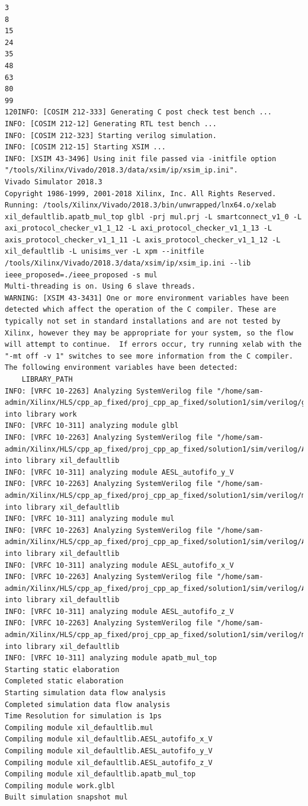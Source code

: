 \documentclass{article}
\begin{document}
\begin{lstlisting}
3
8
15
24
35
48
63
80
99
120INFO: [COSIM 212-333] Generating C post check test bench ...
INFO: [COSIM 212-12] Generating RTL test bench ...
INFO: [COSIM 212-323] Starting verilog simulation. 
INFO: [COSIM 212-15] Starting XSIM ...
INFO: [XSIM 43-3496] Using init file passed via -initfile option "/tools/Xilinx/Vivado/2018.3/data/xsim/ip/xsim_ip.ini".
Vivado Simulator 2018.3
Copyright 1986-1999, 2001-2018 Xilinx, Inc. All Rights Reserved.
Running: /tools/Xilinx/Vivado/2018.3/bin/unwrapped/lnx64.o/xelab xil_defaultlib.apatb_mul_top glbl -prj mul.prj -L smartconnect_v1_0 -L axi_protocol_checker_v1_1_12 -L axi_protocol_checker_v1_1_13 -L axis_protocol_checker_v1_1_11 -L axis_protocol_checker_v1_1_12 -L xil_defaultlib -L unisims_ver -L xpm --initfile /tools/Xilinx/Vivado/2018.3/data/xsim/ip/xsim_ip.ini --lib ieee_proposed=./ieee_proposed -s mul 
Multi-threading is on. Using 6 slave threads.
WARNING: [XSIM 43-3431] One or more environment variables have been detected which affect the operation of the C compiler. These are typically not set in standard installations and are not tested by Xilinx, however they may be appropriate for your system, so the flow will attempt to continue.  If errors occur, try running xelab with the "-mt off -v 1" switches to see more information from the C compiler. The following environment variables have been detected:
    LIBRARY_PATH
INFO: [VRFC 10-2263] Analyzing SystemVerilog file "/home/sam-admin/Xilinx/HLS/cpp_ap_fixed/proj_cpp_ap_fixed/solution1/sim/verilog/glbl.v" into library work
INFO: [VRFC 10-311] analyzing module glbl
INFO: [VRFC 10-2263] Analyzing SystemVerilog file "/home/sam-admin/Xilinx/HLS/cpp_ap_fixed/proj_cpp_ap_fixed/solution1/sim/verilog/AESL_autofifo_y_V.v" into library xil_defaultlib
INFO: [VRFC 10-311] analyzing module AESL_autofifo_y_V
INFO: [VRFC 10-2263] Analyzing SystemVerilog file "/home/sam-admin/Xilinx/HLS/cpp_ap_fixed/proj_cpp_ap_fixed/solution1/sim/verilog/mul.v" into library xil_defaultlib
INFO: [VRFC 10-311] analyzing module mul
INFO: [VRFC 10-2263] Analyzing SystemVerilog file "/home/sam-admin/Xilinx/HLS/cpp_ap_fixed/proj_cpp_ap_fixed/solution1/sim/verilog/AESL_autofifo_x_V.v" into library xil_defaultlib
INFO: [VRFC 10-311] analyzing module AESL_autofifo_x_V
INFO: [VRFC 10-2263] Analyzing SystemVerilog file "/home/sam-admin/Xilinx/HLS/cpp_ap_fixed/proj_cpp_ap_fixed/solution1/sim/verilog/AESL_autofifo_z_V.v" into library xil_defaultlib
INFO: [VRFC 10-311] analyzing module AESL_autofifo_z_V
INFO: [VRFC 10-2263] Analyzing SystemVerilog file "/home/sam-admin/Xilinx/HLS/cpp_ap_fixed/proj_cpp_ap_fixed/solution1/sim/verilog/mul.autotb.v" into library xil_defaultlib
INFO: [VRFC 10-311] analyzing module apatb_mul_top
Starting static elaboration
Completed static elaboration
Starting simulation data flow analysis
Completed simulation data flow analysis
Time Resolution for simulation is 1ps
Compiling module xil_defaultlib.mul
Compiling module xil_defaultlib.AESL_autofifo_x_V
Compiling module xil_defaultlib.AESL_autofifo_y_V
Compiling module xil_defaultlib.AESL_autofifo_z_V
Compiling module xil_defaultlib.apatb_mul_top
Compiling module work.glbl
Built simulation snapshot mul



\end{lstlisting}
\end{document}

